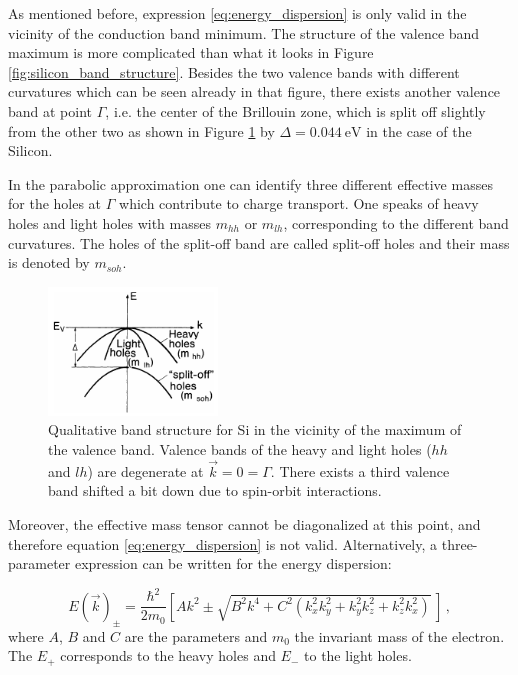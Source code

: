 \documentclass[11pt,a4paper]{article}
\begin{document}
As mentioned before, expression \eqref{eq:energy_dispersion} is only valid in the vicinity of the conduction band minimum. The structure of the valence band maximum is more complicated than what it looks in Figure \ref{fig:silicon_band_structure}. Besides the two valence bands with different curvatures which can be seen already in that figure, there exists another valence band at point $\Gamma$, i.e. the center of the Brillouin zone, which is split off slightly from the other two as shown in Figure \ref{fig:light_heavy_holes} by $\Delta = \SI{0.044}{\electronvolt}$ in the case of the Silicon.

In the parabolic approximation one can identify three different effective masses for the holes at $\Gamma$ which contribute to charge transport. One speaks of heavy holes and light holes with masses $m_{hh}$ or $m_{lh}$, corresponding to the different band curvatures. The holes of the split-off band are called split-off holes and their mass is denoted by $m_{soh}$.

\begin{figure}[ht]
\centering
\includegraphics[width=0.4\textwidth]{light_heavy_holes}
\caption{Qualitative band structure for Si in the vicinity of the maximum of the valence band. Valence bands of the heavy and light holes ($hh$ and $lh$) are degenerate at $\vec{k}=0=\Gamma$. There exists a third valence band shifted a bit down due to spin-orbit interactions.\cite{ibach2009solid}}
\label{fig:light_heavy_holes}
\end{figure}

Moreover, the effective mass tensor cannot be diagonalized at this point, and therefore equation \eqref{eq:energy_dispersion} is not valid. Alternatively, a three-parameter expression can be written for the energy dispersion:

\begin{equation}\label{eq:energy_dispersion_alt}
E(\vec{k})_\pm=\frac{\hbar^2}{2m_0}\left[Ak^2\pm\sqrt{B^2k^4+C^2(k_x^2k_y^2+k_y^2k_z^2+k_z^2k_x^2)}\,\right]\,,
\end{equation}
where $A$, $B$ and $C$ are the parameters and $m_0$ the invariant mass of the electron. The $E_+$ corresponds to the heavy holes and $E_-$ to the light holes.
\end{document}

